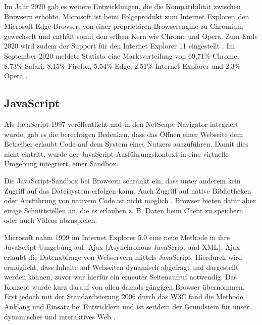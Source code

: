 Im Jahr 2020 gab es weitere Entwicklungen, die die Kompatibilität zwischen Browsern erhöhte. Microsoft ist beim Folgeprodukt zum Internet Explorer, den Microsoft Edge Browser, von einer proprietären Browserengine zu Chromium gewechselt \cite{MicrosoftEdgeChromium} und enthält somit den selben Kern wie Chrome und Opera. Zum Ende 2020 wird zudem der Support für den Internet Explorer 11 eingestellt \cite{MicrosoftInternetExplorerDeprecation}. Im September 2020 meldete Statista eine Marktverteilung von 69,71\% Chrome, 8,73\% Safari, 8,15\% Firefox, 5,54\% Edge, 2,51\% Internet Explorer und 2,3\% Opera \cite{StatistaBrowserMarketshare}.

\subsection{JavaScript}

Als JavaScript 1997 veröffentlicht und in den NetScape Navigator integriert wurde, gab es die berechtigen Bedenken, dass das Öffnen einer Webseite dem Betreiber erlaubt Code auf dem System eines Nutzers auszuführen. Damit dies nicht eintritt, wurde der JavaScript Ausführungskontext in eine virtuelle Umgebung integriert, einer Sandbox. \cite{LearningJavaScript}

Die JavaScript-Sandbox bei Browsern schränkt ein, dass unter anderem kein Zugriff auf das Dateisystem erfolgen kann. Auch Zugriff auf native Bibliotheken oder Ausführung von nativem Code ist nicht möglich \cite{TheSpyInTheSandbox}. Browser bieten dafür aber einige Schnittstellen an, die es erlauben z. B. Daten beim Client zu speichern oder auch Videos abzuspielen.


Microsoft nahm 1999 im Internet Explorer 5.0 eine neue Methode in ihre JavaScript-Umgebung auf: Ajax (Asynchronous JavaScript and XML). Ajax erlaubt die Datenabfrage von Webservern mittels JavaScript. Hierdurch wird ermöglicht, dass Inhalte auf Webseiten dynamisch abgefragt und dargestellt werden können, zuvor war hierfür ein erneuter Seitenaufruf notwendig. Das Konzept wurde kurz darauf von allen damals gängigen Browser übernommen. Erst jedoch mit der Standardisierung 2006 durch das W3C \cite{TheXMLHttpRequestObject} fand die Methode Anklang und Einsatz bei Entwicklern und ist seitdem der Grundstein für unser dynamisches und interaktives Web \cite{TheStoryOfXMLHTTP}.

